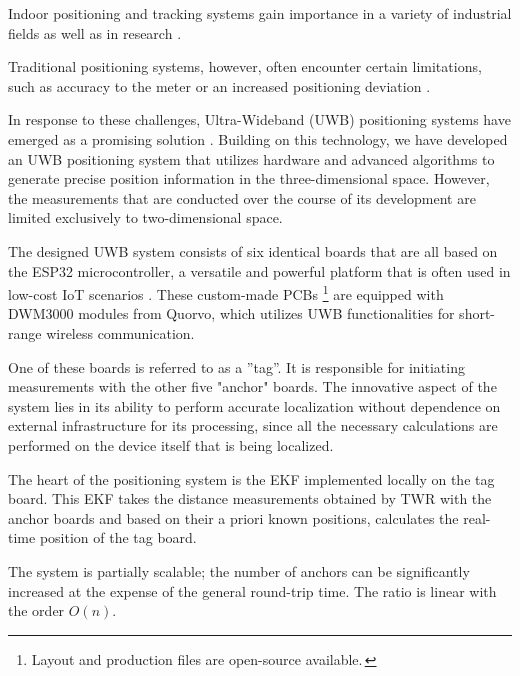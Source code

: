 \documentclass[conference, a4paper]{IEEEtran}
\begin{document}
Indoor positioning and tracking systems gain importance in a variety of industrial fields as well as in research \cite{LiFi_Positioning} \cite{Accelerometer_Positioning} \cite{UWB_Positioning} \cite{UWB_Positioning2}.

Traditional positioning systems, however, often encounter certain limitations, such as accuracy to the meter \cite{LiFi_Positioning} or an increased positioning deviation \cite{Accelerometer_Positioning}. 

In response to these challenges, Ultra-Wideband (UWB) positioning systems have emerged as a promising solution \cite{UWB_Positioning} \cite{UWB_Positioning2}.
Building on this technology, we have developed an \ac{UWB} positioning system that utilizes hardware and advanced algorithms to generate precise position information in the three-dimensional space.
However, the measurements that are conducted over the course of its development are limited exclusively to two-dimensional space. 

The designed \ac{UWB} system consists of six identical boards that are all based on the ESP32 microcontroller, a versatile and powerful platform that is often used in low-cost \ac{IoT} scenarios \cite{ESP32}. 
These custom-made \acp{PCB} \footnote{Layout and production files are open-source available.\,\cite{uwb-tracking}} are equipped with DWM3000 modules from Quorvo, which utilizes \ac{UWB} functionalities for short-range wireless communication.

One of these boards is referred to as a ''tag''.
It is responsible for initiating measurements with the other five "anchor" boards.
The innovative aspect of the system lies in its ability to perform accurate localization without dependence on external infrastructure for its processing,
since all the necessary calculations are performed on the device itself that is being localized.

The heart of the positioning system is the \acf{EKF} implemented locally on the tag board.
This \ac{EKF} takes the distance measurements obtained by \acf{TWR} with the anchor boards
and based on their a priori known positions, calculates the real-time position of the tag board.

The system is partially scalable; the number of anchors can be significantly increased at
the expense of the general round-trip time.
The ratio is linear with the order $O(n)$.
\end{document}
